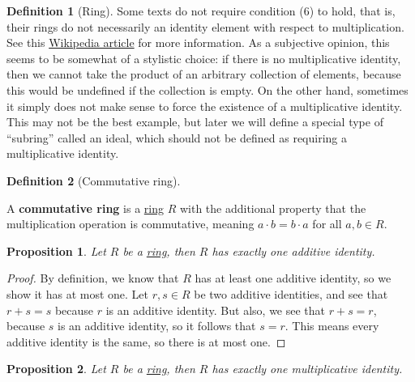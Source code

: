 \documentclass{scrartcl}
\theoremstyle{definition}
\newtheorem{definition}{Definition}[section]
\theoremstyle{plain}
\newtheorem{proposition}{Proposition}[section]
\begin{document}
\begin{definition}[Ring]
    Some texts do not require condition (6) to hold, that is, their rings do not necessarily an identity element with
    respect to multiplication.
    See this \href{https://en.wikipedia.org/wiki/Ring_(mathematics)#Notes_on_the_definition}{Wikipedia article} for
    more information.
    As a subjective opinion, this seems to be somewhat of a stylistic choice: if there is no multiplicative identity,
    then we cannot take the product of an arbitrary collection of elements, because this would be undefined if the
    collection is empty.
    On the other hand, sometimes it simply does not make sense to force the existence of a multiplicative identity.
    This may not be the best example, but later we will define a special type of ``subring'' called an ideal, which
    should not be defined as requiring a multiplicative identity.
\end{definition}

\begin{definition}[Commutative ring]
    \label{def:commutative ring}

    A \textbf{commutative ring} is a \hyperref[def:ring]{ring} $R$ with the additional property that the multiplication
    operation is commutative, meaning $a\cdot b=b\cdot a$ for all $a,b\in R$.
\end{definition}

\begin{proposition}
    \label{prop:unique additive identity}
    Let $R$ be a \hyperref[def:ring]{ring}, then $R$ has exactly one additive identity.
\end{proposition}

\begin{proof}
    By definition, we know that $R$ has at least one additive identity, so we show it has at most one.
    Let $r,s\in R$ be two additive identities, and see that $r+s=s$ because $r$ is an additive identity.
    But also, we see that $r+s=r$, because $s$ is an additive identity, so it follows that $s=r$.
    This means every additive identity is the same, so there is at most one.
\end{proof}

\begin{proposition}
    \label{prop:unique multiplicative identity}
    Let $R$ be a \hyperref[def:ring]{ring}, then $R$ has exactly one multiplicative identity.
\end{proposition}
\end{document}
